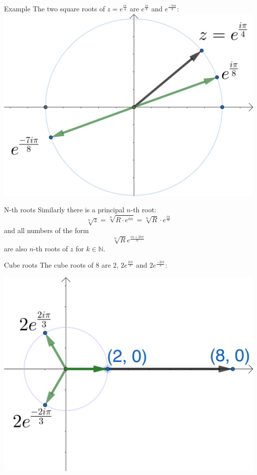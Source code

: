 \documentclass{beamer}
\begin{document}
\begin{frame}{Example}
  	The two square roots of $z = e^{\frac{i\pi}{4}}$ are $e^{\frac{i\pi}{8}}$ and $e^{\frac{-7i\pi}{8}}$:\vfill
	\includegraphics[scale=3]{roots-pi-4.png}
\end{frame}

\begin{frame}{N-th roots}
Similarly there is a principal $n$-th root:\vfill
{\LARGE
\begin{equation*}
\sqrt[n]{z} = \sqrt[n]{R\cdot e^{i\alpha}} = \sqrt[n]{R}\cdot e^{\frac{i\alpha}{n}}
\end{equation*}}\vfill
and all numbers of the form\vfill
{\LARGE
\begin{equation*}
	\sqrt[n]{R}e^{\frac{i\alpha+2k\pi}{n}}
\end{equation*}
}\vfill
are also $n$-th roots of $z$ for $k\in \mathbb{N}$.
\end{frame}

\begin{frame}{Cube roots}
The cube roots of $8$ are $2$, $2e^{\frac{2i\pi}{3}}$ and $2e^{\frac{-2i\pi}{3}}$:\vfill
\begin{center}
\includegraphics[scale=0.7]{cube-roots-8.png}
\end{center}
\end{frame}
\end{document}

